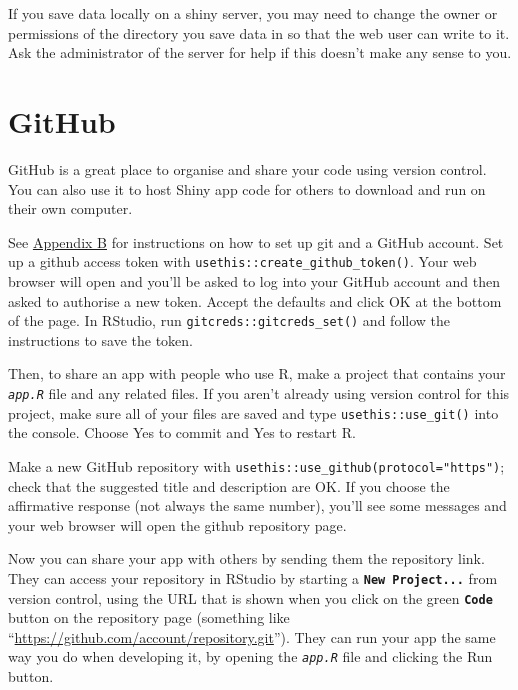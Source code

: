 \documentclass[
  oneside]{book}
\begin{document}
\begin{info}
If you save data locally on a shiny server, you may need to change the owner or permissions of the directory you save data in so that the web user can write to it. Ask the administrator of the server for help if this doesn't make any sense to you.

\end{info}

\hypertarget{github}{%
\section{GitHub}\label{github}}

GitHub is a great place to organise and share your code using version control. You can also use it to host Shiny app code for others to download and run on their own computer.

See \protect\hyperlink{setup-git}{Appendix B} for instructions on how to set up git and a GitHub account. Set up a github access token with \texttt{usethis::create\_github\_token}\texttt{()}. Your web browser will open and you'll be asked to log into your GitHub account and then asked to authorise a new token. Accept the defaults and click OK at the bottom of the page. In RStudio, run \texttt{gitcreds::gitcreds\_set}\texttt{()} and follow the instructions to save the token.

Then, to share an app with people who use R, make a project that contains your \textit{\texttt{app.R}} file and any related files. If you aren't already using version control for this project, make sure all of your files are saved and type \texttt{usethis::use\_git}\texttt{()} into the console. Choose Yes to commit and Yes to restart R.

Make a new GitHub repository with \texttt{usethis::use\_github}\texttt{(protocol="https")}; check that the suggested title and description are OK. If you choose the affirmative response (not always the same number), you'll see some messages and your web browser will open the github repository page.

Now you can share your app with others by sending them the repository link. They can access your repository in RStudio by starting a \textbf{\texttt{New\ Project...}} from version control, using the URL that is shown when you click on the green \textbf{\texttt{Code}} button on the repository page (something like ``\url{https://github.com/account/repository.git}''). They can run your app the same way you do when developing it, by opening the \textit{\texttt{app.R}} file and clicking the Run button.
\end{document}
